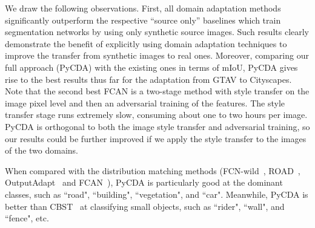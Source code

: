 \documentclass[10pt,twocolumn,letterpaper]{article}
\begin{document}
We draw the following observations. First, all domain adaptation methods significantly outperform the respective ``source only'' baselines which train segmentation networks by using only synthetic source images. Such results clearly demonstrate the benefit of explicitly using domain adaptation techniques to improve the transfer from synthetic images to real ones. Moreover, comparing our full approach (PyCDA) with the existing ones in terms of mIoU, PyCDA gives rise to the best results thus far for the adaptation from GTAV to Cityscapes. Note that the second best FCAN is a two-stage method with style transfer on the image pixel level and then an adversarial training of the features. The style transfer stage runs extremely slow, consuming about one to two hours per image. PyCDA is orthogonal to both the image style transfer and adversarial training, so our results could  be further improved if we apply the style transfer to the images of the two domains.



When compared with the distribution matching methods (FCN-wild~\cite{fcn_wild}, ROAD~\cite{road_2018_CVPR}, OutputAdapt~\cite{Adaptseg_Tsai_2018_CVPR} and FCAN~\cite{fcan_2018_CVPR}), PyCDA is particularly good at the dominant classes, such as ``road", ``building", ``vegetation", and ``car". Meanwhile, PyCDA is better than CBST~\cite{self_motivated_2018_ECCV} at classifying small objects, such as ``rider", ``wall", and ``fence", etc.
\end{document}
